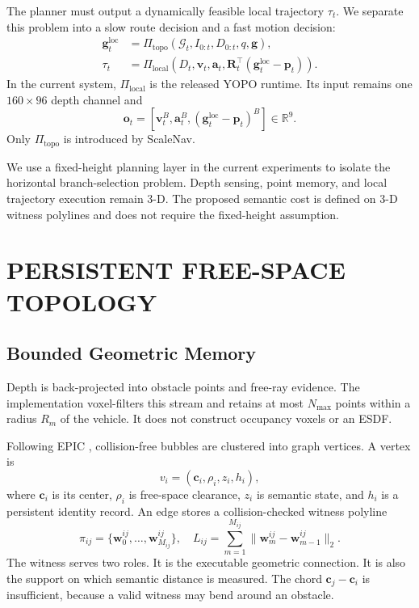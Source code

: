 \documentclass[letterpaper,10pt,conference]{ieeeconf}
\newcommand{\vect}[1]{\boldsymbol{#1}}
\newcommand{\R}{\mathbb{R}}
\begin{document}
The planner must output a dynamically feasible local trajectory $\tau_t$.
We separate this problem into a slow route decision and a fast motion
decision:
\begin{align}
  \vect{g}^{\mathrm{loc}}_t
    &= \Pi_{\mathrm{topo}}(\mathcal{G}_t,I_{0:t},D_{0:t},q,\vect{g}), \\
  \tau_t
    &= \Pi_{\mathrm{local}}(D_t,\vect{v}_t,\vect{a}_t,
       \vect{R}_t^\top(\vect{g}^{\mathrm{loc}}_t-\vect{p}_t)).
\end{align}
In the current system, $\Pi_{\mathrm{local}}$ is the released YOPO runtime.
Its input remains one $160\times96$ depth channel and
\begin{equation}
 \vect{o}_t = [\vect{v}^{B}_t,\vect{a}^{B}_t,
                (\vect{g}^{\mathrm{loc}}_t-\vect{p}_t)^{B}] \in \R^9.
\end{equation}
Only $\Pi_{\mathrm{topo}}$ is introduced by ScaleNav.

We use a fixed-height planning layer in the current experiments to isolate
the horizontal branch-selection problem.
Depth sensing, point memory, and local trajectory execution remain 3-D.
The proposed semantic cost is defined on 3-D witness polylines and does not
require the fixed-height assumption.

\section{PERSISTENT FREE-SPACE TOPOLOGY}
\label{sec:topology}
\subsection{Bounded Geometric Memory}
Depth is back-projected into obstacle points and free-ray evidence.
The implementation voxel-filters this stream and retains at most $N_{\max}$
points within a radius $R_m$ of the vehicle.
It does not construct occupancy voxels or an ESDF.

Following EPIC \cite{epic}, collision-free bubbles are clustered into graph
vertices.
A vertex is
\begin{equation}
 v_i=(\vect{c}_i,\rho_i,z_i,h_i),
\end{equation}
where $\vect{c}_i$ is its center, $\rho_i$ is free-space clearance, $z_i$ is
semantic state, and $h_i$ is a persistent identity record.
An edge stores a collision-checked witness polyline
\begin{equation}
 \pi_{ij}=\{\vect{w}^{ij}_0,\ldots,\vect{w}^{ij}_{M_{ij}}\},
 \quad
 L_{ij}=\sum_{m=1}^{M_{ij}}
 \|\vect{w}^{ij}_m-\vect{w}^{ij}_{m-1}\|_2.
\end{equation}
The witness serves two roles. It is the executable geometric connection. It
is also the support on which semantic distance is measured. The chord
$\vect{c}_j-\vect{c}_i$ is insufficient, because a valid witness may bend
around an obstacle.
\end{document}
